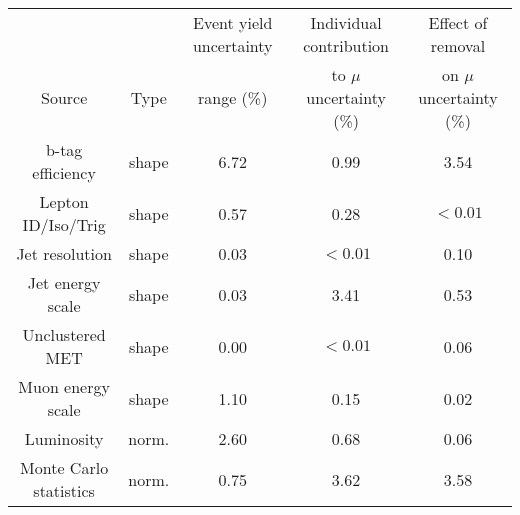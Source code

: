 \begin{adjustbox}{width=\textwidth,center=\textwidth}
\begin{tabular}{ccccc} \hline \hline
&  & Event yield uncertainty &Individual contribution & Effect of removal  \\
Source & Type & range (\%) &  to $\mu$ uncertainty (\%) & on $\mu$ uncertainty (\%) \\ \hline 
b-tag efficiency & shape & 6.72 & 0.99 & 3.54\\
Lepton ID/Iso/Trig & shape & 0.57 & 0.28 & $<0.01$\\
Jet resolution & shape & 0.03 & $<0.01$ & 0.10\\
Jet energy scale & shape & 0.03 & 3.41 & 0.53\\
Unclustered MET & shape & 0.00 & $<0.01$ & 0.06\\
Muon energy scale & shape & 1.10 & 0.15 & 0.02\\
Luminosity & norm. & 2.60 & 0.68 & 0.06\\
Monte Carlo statistics & norm. & 0.75 & 3.62 & 3.58\\
\hline 
\end{tabular}
 \end{adjustbox}
